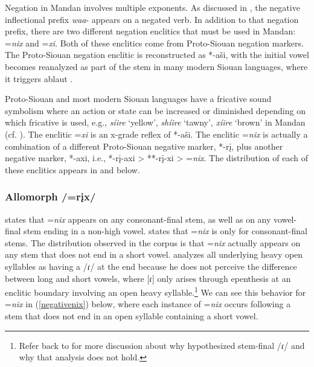 Negation in Mandan involves multiple exponents. As discussed in , the negative inflectional prefix \textit{waa}- appears on a negated verb. In addition to that negation prefix, there are two different negation enclitics that must be used in Mandan: =\textit{nix} and =\textit{xi}. Both of these enclitics come from Proto-Siouan negation markers. The Proto-Siouan negation enclitic is reconstructed as *-aši, with the initial vowel becomes reanalyzed as part of the stem in many modern Siouan languages, where it triggers ablaut \citep{rankin2015}.

Proto-Siouan and most modern Siouan languages have a fricative sound symbolism where an action or state can be increased or diminished depending on which fricative is used, e.g., \textit{síire} `yellow', \textit{shíire} `tawny', \textit{xíire} `brown' in Mandan (cf. ). The enclitic =\textit{xi} is an x-grade reflex of *-aši. The enclitic =\textit{nix} is actually a combination of a different Proto-Siouan negative marker, *-rį, plus another negative marker, *-axi, i.e., *-rį-axi > **-rį-xi > =\textit{nix}. The distribution of each of these enclitics appears in  and  below.

\subsubsection{Allomorph /=rįx/}\label{SubSubNIX}
\largerpage
\citet[23]{kennard1936} states that =\textit{nix} appears on any consonant-final stem, as well as on any vowel-final stem ending in a non-high vowel. \citet[31]{hollow1970} states that =\textit{nix} is only for consonant-final stems. The distribution observed in the corpus is that =\textit{nix} actually appears on any stem that does not end in a short vowel. \citeauthor{hollow1970} analyzes all underlying heavy open syllables as having a /ɾ/ at the end because he does not perceive the difference between long and short vowels, where [ɾ] only arises through epenthesis at an enclitic boundary involving an open heavy syllable.\footnote{Refer back to  for more discussion about why \citet{hollow1970} hypothesized stem-final /ɾ/ and why that analysis does not hold.} We can see this behavior for =\textit{nix} in (\ref{negativenix}) below, where each instance of =\textit{nix} occurs following a stem that does not end in an open syllable containing a short vowel.

